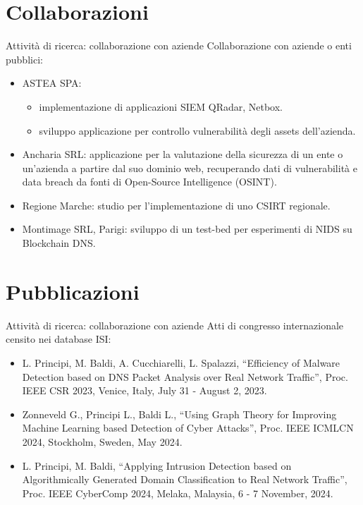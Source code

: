 \documentclass[10pt,xcolor=dvipsnames]{beamer}
\begin{document}
\section{Collaborazioni}
\begin{frame}{Attività di ricerca: collaborazione con aziende}
  Collaborazione con aziende o enti pubblici:
  \begin{itemize}
      \item ASTEA SPA:
      \begin{itemize}
          \item implementazione di applicazioni SIEM QRadar, Netbox.
          \item sviluppo applicazione per controllo vulnerabilità degli assets dell'azienda.
      \end{itemize}
      \item Ancharia SRL: applicazione per la valutazione della sicurezza di un ente o un'azienda a partire dal suo dominio web, recuperando
      dati di vulnerabilità e data breach da fonti di Open-Source Intelligence (OSINT).
      \item Regione Marche: studio per l'implementazione di uno CSIRT regionale.
      \item Montimage SRL, Parigi: sviluppo di un test-bed per esperimenti di NIDS su Blockchain DNS.
  \end{itemize}
\end{frame}

\section{Pubblicazioni}
  \begin{frame}{Attività di ricerca: collaborazione con aziende}
    Atti di congresso internazionale censito nei database ISI:
    \begin{itemize}
      \item L. Principi, M. Baldi, A. Cucchiarelli, L. Spalazzi, “Efficiency of Malware Detection based on DNS Packet Analysis over Real Network Traffic”, Proc. IEEE CSR 2023, Venice, Italy, July 31 - August 2, 2023.
      \item Zonneveld G., Principi L., Baldi L., “Using Graph Theory for Improving Machine Learning based Detection of Cyber Attacks”, Proc. IEEE ICMLCN 2024, Stockholm, Sweden, May 2024.
      \item L. Principi, M. Baldi, “Applying Intrusion Detection based on Algorithmically Generated Domain Classification to Real Network Traffic”, Proc. IEEE CyberComp 2024, Melaka, Malaysia, 6 - 7 November, 2024.
    \end{itemize}
  \end{frame}
\end{document}
